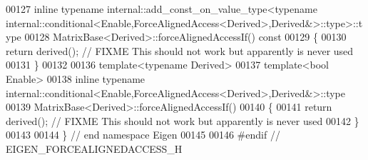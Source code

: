 \begin{DoxyCode}
00127 \textcolor{keyword}{inline} \textcolor{keyword}{typename} internal::add\_const\_on\_value\_type<typename
       internal::conditional<Enable,ForceAlignedAccess<Derived>,Derived&>::type>::type
00128 MatrixBase<Derived>::forceAlignedAccessIf()\textcolor{keyword}{ const}
00129 \textcolor{keyword}{}\{
00130   \textcolor{keywordflow}{return} derived();  \textcolor{comment}{// FIXME This should not work but apparently is never used}
00131 \}
00132 
00136 \textcolor{keyword}{template}<\textcolor{keyword}{typename} Derived>
00137 \textcolor{keyword}{template}<\textcolor{keywordtype}{bool} Enable>
00138 \textcolor{keyword}{inline} \textcolor{keyword}{typename} internal::conditional<Enable,ForceAlignedAccess<Derived>,Derived&>::type
00139 MatrixBase<Derived>::forceAlignedAccessIf()
00140 \{
00141   \textcolor{keywordflow}{return} derived();  \textcolor{comment}{// FIXME This should not work but apparently is never used}
00142 \}
00143 
00144 \} \textcolor{comment}{// end namespace Eigen}
00145 
00146 \textcolor{preprocessor}{#endif // EIGEN\_FORCEALIGNEDACCESS\_H}
\end{DoxyCode}
